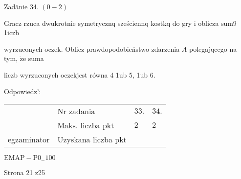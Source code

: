 \documentclass[a4paper,12pt]{article}
\begin{document}
Zadänie 34. $(0-2)$

Gracz rzuca dwukrotnie symetrycznq sześciennq kostkq do gry i oblicza sum9 1iczb

wyrzuconych oczek. Oblicz prawdopodobieństwo zdarzenia $A$ polegajqcego na tym, $\dot{\mathrm{z}}\mathrm{e}$ suma

liczb wyrzuconych oczekjest równa 4 1ub 5, 1ub 6.

Odpowiedz':
\begin{center}
\begin{tabular}{|l|l|l|l|}
\cline{2-4}
&	\multicolumn{1}{|l|}{Nr zadania}&	\multicolumn{1}{|l|}{$33.$}&	\multicolumn{1}{|l|}{ $34.$}	\\
\cline{2-4}
&	\multicolumn{1}{|l|}{Maks. liczba pkt}&	\multicolumn{1}{|l|}{$2$}&	\multicolumn{1}{|l|}{ $2$}	\\
\cline{2-4}
\multicolumn{1}{|l|}{egzaminator}&	\multicolumn{1}{|l|}{Uzyskana liczba pkt}&	\multicolumn{1}{|l|}{}&	\multicolumn{1}{|l|}{}	\\
\hline
\end{tabular}

\end{center}
$\mathrm{E}\mathrm{M}\mathrm{A}\mathrm{P}-\mathrm{P}0_{-}100$

Strona 21 z25
\end{document}
